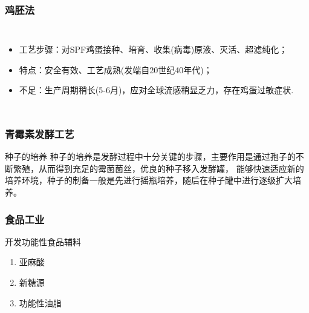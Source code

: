 \documentclass[10pt,aspectratio=43,mathserif]{beamer}
\begin{document}
\begin{frame}
\frametitle{鸡胚法}
\begin{columns}[c]
\begin{itemize}
    \item 工艺步骤：对SPF鸡蛋接种、培育、收集(病毒)原液、灭活、超滤纯化；
    \item 特点：安全有效、工艺成熟(发端自20世纪40年代)；
    \item 不足：生产周期稍长(5-6月)，应对全球流感稍显乏力，存在鸡蛋过敏症状.
\end{itemize}
\end{columns}
\end{frame}


    \begin{frame}
    \frametitle{\textbf{青霉素发酵工艺}}
        \begin{block}{种子的培养}
            种子的培养是发酵过程中十分关键的步骤，主要作用是通过孢子的不断繁殖，从而得到充足的霉菌菌丝，优良的种子移入发酵罐，
            能够快速适应新的培养环境，种子的制备一般是先进行摇瓶培养，随后在种子罐中进行逐级扩大培养。
        \end{block}
    \end{frame}

       \begin{frame}
        \frametitle{食品工业}
        \begin{block}{开发功能性食品辅料}
            \begin{enumerate}
                \item 亚麻酸
                \item 新糖源
                \item 功能性油脂
            \end{enumerate}
        \end{block}
        \end{frame}
\end{document}

